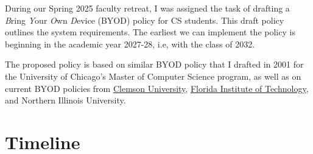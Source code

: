 

\noindent 
During our Spring 2025 faculty retreat, I was assigned the task of drafting a \emph{B}ring \emph{Y}our \emph{O}wn \emph{D}evice (BYOD) policy for CS students. This draft policy outlines the system requirements. The earliest we can implement the policy is beginning in the academic year 2027-28, i.e, with the class of 2032.

The proposed policy is based on similar BYOD policy that I drafted in 2001 for the University of Chicago's Master of Computer Science program, as well as on current BYOD policies from \href{https://clemsonpub.cfmnetwork.com/B.aspx?BookId=11654&PageId=458060}{Clemson University}, \href{https://www.fit.edu/policies/information-technology/policies/it-1015-bring-your-own-device-byod-policy/}{Florida Institute of Technology}, and Northern Illinois University.
    


\section*{Timeline}


